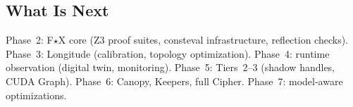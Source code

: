 \subsection{What Is Next}

Phase~2: F$\star$X core (Z3 proof suites, consteval infrastructure, reflection checks).
Phase~3: Longitude (calibration, topology optimization).
Phase~4: runtime observation (digital twin, monitoring).
Phase~5: Tiers~2--3 (shadow handles, CUDA Graph).
Phase~6: Canopy, Keepers, full Cipher.
Phase~7: model-aware optimizations.
